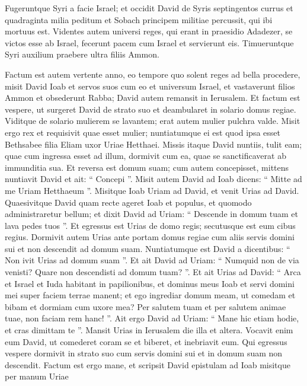 \begin{biblechapter}
\begin{biblechapter}
\begin{biblechapter}
\begin{biblechapter}
\begin{biblechapter}
\begin{biblechapter}
\begin{biblechapter}
\begin{biblechapter}
\begin{biblechapter}
\begin{biblechapter}
\verse Fugeruntque Syri a facie Israel; et occidit David de Syris septingentos currus et quadraginta milia peditum et Sobach principem militiae percussit, qui ibi mortuus est. 
\verse Videntes autem universi reges, qui erant in praesidio Adadezer, se victos esse ab Israel, fecerunt pacem cum Israel et servierunt eis. Timueruntque Syri auxilium praebere ultra filiis Ammon.
 
\begin{biblechapter}
\verse Factum est autem vertente anno, eo tempore quo solent reges ad bella procedere, misit David Ioab et servos suos cum eo et universum Israel, et vastaverunt filios Ammon et obsederunt Rabba; David autem remansit in Ierusalem.
 \verse Et factum est vespere, ut surgeret David de strato suo et deambularet in solario domus regiae. Viditque de solario mulierem se lavantem; erat autem mulier pulchra valde. 
\verse Misit ergo rex et requisivit quae esset mulier; nuntiatumque ei est quod ipsa esset Bethsabee filia Eliam uxor Uriae Hetthaei. 
 \verse Missis itaque David nuntiis, tulit eam; quae cum ingressa esset ad illum, dormivit cum ea, quae se sanctificaverat ab immunditia sua. 
\verse Et reversa est domum suam; cum autem concepisset, mittens nuntiavit David et ait: “ Concepi ”.
 \verse Misit autem David ad Ioab dicens: “ Mitte ad me Uriam Hetthaeum ”. Misitque Ioab Uriam ad David, 
\verse et venit Urias ad David. Quaesivitque David quam recte ageret Ioab et populus, et quomodo administraretur bellum; 
\verse et dixit David ad Uriam: “ Descende in domum tuam et lava pedes tuos ”. Et egressus est Urias de domo regis; secutusque est eum cibus regius. 
\verse Dormivit autem Urias ante portam domus regiae cum aliis servis domini sui et non descendit ad domum suam.
 \verse Nuntiatumque est David a dicentibus: “ Non ivit Urias ad domum suam ”. Et ait David ad Uriam: “ Numquid non de via venisti? Quare non descendisti ad domum tuam? ”. 
\verse Et ait Urias ad David: “ Arca et Israel et Iuda habitant in papilionibus, et dominus meus Ioab et servi domini mei super faciem terrae manent; et ego ingrediar domum meam, ut comedam et bibam et dormiam cum uxore mea? Per salutem tuam et per salutem animae tuae, non faciam rem hanc! ”. 
\verse Ait ergo David ad Uriam: “ Mane hic etiam hodie, et cras dimittam te ”. Mansit Urias in Ierusalem die illa et altera. 
\verse Vocavit enim eum David, ut comederet coram se et biberet, et inebriavit eum. Qui egressus vespere dormivit in strato suo cum servis domini sui et in domum suam non descendit.
 \verse Factum est ergo mane, et scripsit David epistulam ad Ioab misitque per manum Uriae 

\end{biblechapter}
\end{biblechapter}
\end{biblechapter}
\end{biblechapter}
\end{biblechapter}
\end{biblechapter}
\end{biblechapter}
\end{biblechapter}
\end{biblechapter}
\end{biblechapter}
\end{biblechapter}
